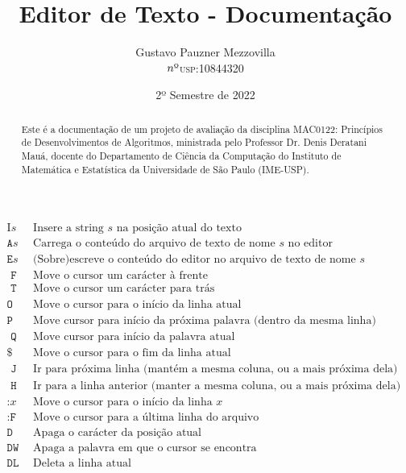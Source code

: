 \documentclass[a4paper, 11pt]{article}
\title{\textbf{Editor de Texto - Documentação}}
\author{Gustavo Pauzner Mezzovilla\\ \texorpdfstring{$n{\text{\textordmasculine}}$}{nº}\textsc{usp}:10844320}
\date{2º Semestre de 2022}
\begin{document}
\maketitle

\begin{abstract}
	Este é a documentação de um projeto de avaliação da disciplina \textsc{MAC0122}: Princípios de Desenvolvimentos de Algoritmos, ministrada pelo Professor Dr. Denis Deratani Mauá, docente do Departamento de Ciência da Computação do Instituto de Matemática e Estatística da Universidade de São Paulo (IME-USP). 
\end{abstract}

$$
\begin{array}{|c|l|}
\hline \text {I}s & \text { Insere a string } s \text { na posição atual do texto } \\
\texttt {A}s & \text { Carrega o conteúdo do arquivo de texto de nome } s \text { no editor } \\
\texttt{E}s & \text { (Sobre)escreve o conteúdo do editor no arquivo de texto de nome } s \\
\texttt{ F } & \text { Move o cursor um carácter à frente } \\
\texttt{ T } & \text { Move o cursor um carácter para trás } \\
\texttt{O} & \text { Move o cursor para o início da linha atual } \\
\texttt{P} & \text { Move cursor para início da próxima palavra (dentro da mesma linha) } \\
\texttt{ Q } & \text { Move cursor para início da palavra atual } \\
\$ & \text { Move o cursor para o fim da linha atual } \\
\texttt{ J } & \text { Ir para próxima linha (mantém a mesma coluna, ou a mais próxima dela) } \\
\texttt{ H } & \text { Ir para a linha anterior (manter a mesma coluna, ou a mais próxima dela) } \\
\texttt{:}x & \text { Move o cursor para o início da linha } x \\
\texttt{:F} & \text { Move o cursor para a última linha do arquivo } \\
\texttt{D} & \text { Apaga o carácter da posição atual } \\
\texttt{DW} & \text { Apaga a palavra em que o cursor se encontra } \\
\texttt{DL} & \text { Deleta a linha atual } \\

\end{array}$$
\end{document}

